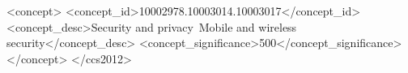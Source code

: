 \documentclass[sigconf]{acmart}
\begin{document}


\begin{CCSXML}
   <concept>
       <concept_id>10002978.10003014.10003017</concept_id>
       <concept_desc>Security and privacy~Mobile and wireless security</concept_desc>
       <concept_significance>500</concept_significance>
       </concept>
 </ccs2012>
\end{CCSXML}




\end{document}

